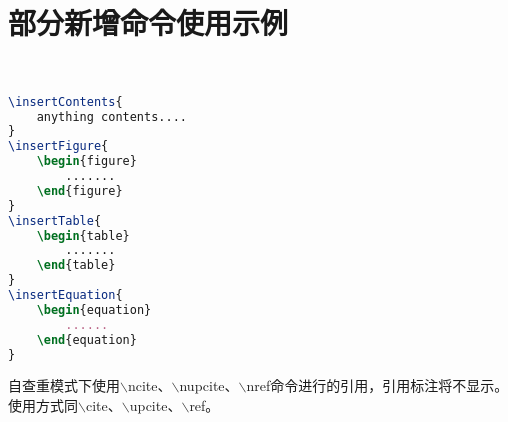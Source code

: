 \documentclass[oneside, master,normal]{BIT-thesis-grd-jdh}
\begin{document}
\chapter{部分新增命令使用示例}
\\
\begin{lstlisting}[language={tex}, caption={$\backslash$insert*系列指令使用示例}]
\insertContents{
	anything contents....
}
\insertFigure{
	\begin{figure}
		.......
	\end{figure}
}
\insertTable{
	\begin{table}
		.......
	\end{table}
}
\insertEquation{
	\begin{equation}
		......
	\end{equation}
}
\end{lstlisting}

自查重模式下使用$\backslash$ncite、$\backslash$nupcite、$\backslash$nref命令进行的引用，引用标注将不显示。使用方式同$\backslash$cite、$\backslash$upcite、$\backslash$ref。







\appendix
\renewcommand\theequation{\Alph{chapter}--\arabic{equation}}  %
\renewcommand\thefigure{\Alph{chapter}--\arabic{figure}}
\renewcommand\thetable{\Alph{chapter}--\arabic{table}}

 
 

\backmatter




\end{document}
